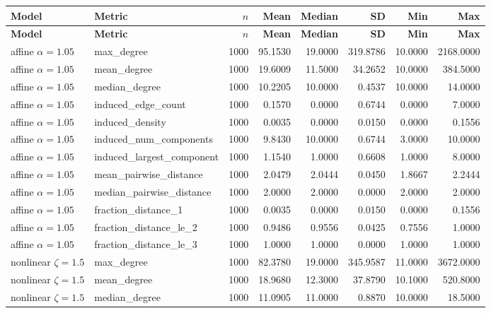 \documentclass[10pt,letterpaper]{article}
\newcommand{\Hdr}[1]{\cellcolor{navy}\color{white}\bfseries #1}
\begin{document}
\scriptsize{}\begin{longtable}{|l|l|r|r|r|r|r|r|}\hline
\Hdr{Model} & \Hdr{Metric} & \Hdr{$n$} & \Hdr{Mean} & \Hdr{Median} & \Hdr{SD} & \Hdr{Min} & \Hdr{Max}\\\hline\endfirsthead
\hline \Hdr{Model} & \Hdr{Metric} & \Hdr{$n$} & \Hdr{Mean} & \Hdr{Median} & \Hdr{SD} & \Hdr{Min} & \Hdr{Max}\\\hline\endhead
affine $\alpha=1.05$ & max\_degree & 1000 & 95.1530 & 19.0000 & 319.8786 & 10.0000 & 2168.0000 \\\hline
affine $\alpha=1.05$ & mean\_degree & 1000 & 19.6009 & 11.5000 & 34.2652 & 10.0000 & 384.5000 \\\hline
affine $\alpha=1.05$ & median\_degree & 1000 & 10.2205 & 10.0000 & 0.4537 & 10.0000 & 14.0000 \\\hline
affine $\alpha=1.05$ & induced\_edge\_count & 1000 & 0.1570 & 0.0000 & 0.6744 & 0.0000 & 7.0000 \\\hline
affine $\alpha=1.05$ & induced\_density & 1000 & 0.0035 & 0.0000 & 0.0150 & 0.0000 & 0.1556 \\\hline
affine $\alpha=1.05$ & induced\_num\_components & 1000 & 9.8430 & 10.0000 & 0.6744 & 3.0000 & 10.0000 \\\hline
affine $\alpha=1.05$ & induced\_largest\_component & 1000 & 1.1540 & 1.0000 & 0.6608 & 1.0000 & 8.0000 \\\hline
affine $\alpha=1.05$ & mean\_pairwise\_distance & 1000 & 2.0479 & 2.0444 & 0.0450 & 1.8667 & 2.2444 \\\hline
affine $\alpha=1.05$ & median\_pairwise\_distance & 1000 & 2.0000 & 2.0000 & 0.0000 & 2.0000 & 2.0000 \\\hline
affine $\alpha=1.05$ & fraction\_distance\_1 & 1000 & 0.0035 & 0.0000 & 0.0150 & 0.0000 & 0.1556 \\\hline
affine $\alpha=1.05$ & fraction\_distance\_le\_2 & 1000 & 0.9486 & 0.9556 & 0.0425 & 0.7556 & 1.0000 \\\hline
affine $\alpha=1.05$ & fraction\_distance\_le\_3 & 1000 & 1.0000 & 1.0000 & 0.0000 & 1.0000 & 1.0000 \\\hline
\hline
nonlinear $\zeta=1.5$ & max\_degree & 1000 & 82.3780 & 19.0000 & 345.9587 & 11.0000 & 3672.0000 \\\hline
nonlinear $\zeta=1.5$ & mean\_degree & 1000 & 18.9680 & 12.3000 & 37.8790 & 10.1000 & 520.8000 \\\hline
nonlinear $\zeta=1.5$ & median\_degree & 1000 & 11.0905 & 11.0000 & 0.8870 & 10.0000 & 18.5000 \\\hline

\end{longtable}
\end{document}
